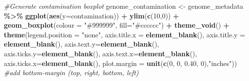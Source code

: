 \documentclass[
]{book}
\newenvironment{Shaded}{\begin{snugshade}}{\end{snugshade}}
\newcommand{\AttributeTok}[1]{\textcolor[rgb]{0.13,0.29,0.53}{#1}}
\newcommand{\CommentTok}[1]{\textcolor[rgb]{0.56,0.35,0.01}{\textit{#1}}}
\newcommand{\DecValTok}[1]{\textcolor[rgb]{0.00,0.00,0.81}{#1}}
\newcommand{\FloatTok}[1]{\textcolor[rgb]{0.00,0.00,0.81}{#1}}
\newcommand{\FunctionTok}[1]{\textcolor[rgb]{0.13,0.29,0.53}{\textbf{#1}}}
\newcommand{\NormalTok}[1]{#1}
\newcommand{\OtherTok}[1]{\textcolor[rgb]{0.56,0.35,0.01}{#1}}
\newcommand{\SpecialCharTok}[1]{\textcolor[rgb]{0.81,0.36,0.00}{\textbf{#1}}}
\newcommand{\StringTok}[1]{\textcolor[rgb]{0.31,0.60,0.02}{#1}}
\begin{document}
\begin{Shaded}
\begin{Highlighting}[]
\CommentTok{\#Generate contamination boxplot}
\NormalTok{genome\_contamination }\OtherTok{\textless{}{-}}\NormalTok{ genome\_metadata }\SpecialCharTok{\%\textgreater{}\%}
            \FunctionTok{ggplot}\NormalTok{(}\FunctionTok{aes}\NormalTok{(}\AttributeTok{y=}\NormalTok{contamination)) }\SpecialCharTok{+}
                    \FunctionTok{ylim}\NormalTok{(}\FunctionTok{c}\NormalTok{(}\DecValTok{10}\NormalTok{,}\DecValTok{0}\NormalTok{)) }\SpecialCharTok{+}
                    \FunctionTok{geom\_boxplot}\NormalTok{(}\AttributeTok{colour =} \StringTok{"\#999999"}\NormalTok{, }\AttributeTok{fill=}\StringTok{"\#cccccc"}\NormalTok{) }\SpecialCharTok{+}
                    \FunctionTok{theme\_void}\NormalTok{() }\SpecialCharTok{+}
                    \FunctionTok{theme}\NormalTok{(}\AttributeTok{legend.position =} \StringTok{"none"}\NormalTok{,}
                        \AttributeTok{axis.title.x =} \FunctionTok{element\_blank}\NormalTok{(),}
                        \AttributeTok{axis.title.y =} \FunctionTok{element\_blank}\NormalTok{(),}
                        \AttributeTok{axis.text.y=}\FunctionTok{element\_blank}\NormalTok{(),}
                        \AttributeTok{axis.ticks.y=}\FunctionTok{element\_blank}\NormalTok{(),}
                        \AttributeTok{axis.text.x=}\FunctionTok{element\_blank}\NormalTok{(),}
                        \AttributeTok{axis.ticks.x=}\FunctionTok{element\_blank}\NormalTok{(),}
                        \AttributeTok{plot.margin =} \FunctionTok{unit}\NormalTok{(}\FunctionTok{c}\NormalTok{(}\DecValTok{0}\NormalTok{, }\DecValTok{0}\NormalTok{, }\FloatTok{0.40}\NormalTok{, }\DecValTok{0}\NormalTok{),}\StringTok{"inches"}\NormalTok{)) }\CommentTok{\#add bottom{-}margin (top, right, bottom, left)}


\end{Highlighting}
\end{Shaded}
\end{document}
